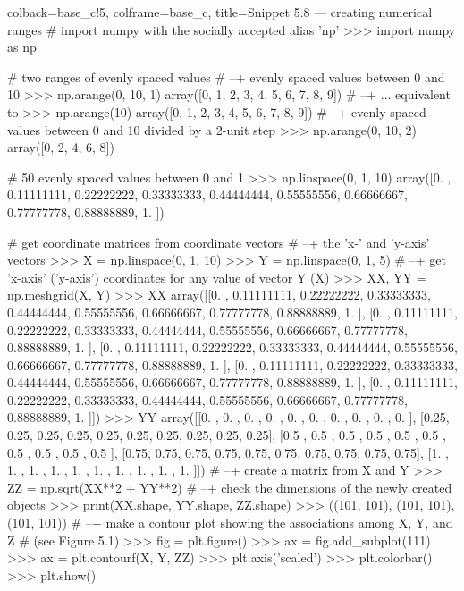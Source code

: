 \documentclass[a4paper,11pt]{book}
\begin{document}
\begin{pythoncode}[linenos=true,]{colback=base_c!5, colframe=base_c, title=\sffamily Snippet 5.8 --- creating numerical ranges}
# import numpy with the socially accepted alias 'np'
>>> import numpy as np

# two ranges of evenly spaced values
# --+ evenly spaced values between 0 and 10
>>> np.arange(0, 10, 1)
array([0, 1, 2, 3, 4, 5, 6, 7, 8, 9])
# --+ ... equivalent to
>>> np.arange(10)
array([0, 1, 2, 3, 4, 5, 6, 7, 8, 9])
# --+ evenly spaced values between 0 and 10 divided by a 2-unit step
>>> np.arange(0, 10, 2)
array([0, 2, 4, 6, 8])

# 50 evenly spaced values between 0 and 1
>>> np.linspace(0, 1, 10)
array([0.        , 0.11111111, 0.22222222, 0.33333333, 0.44444444,
       0.55555556, 0.66666667, 0.77777778, 0.88888889, 1.        ])

# get coordinate matrices from coordinate vectors 
# --+ the 'x-' and 'y-axis' vectors
>>> X = np.linspace(0, 1, 10)
>>> Y = np.linspace(0, 1, 5)
# --+ get 'x-axis' ('y-axis') coordinates for any value of vector Y (X)
>>> XX, YY = np.meshgrid(X, Y)
>>> XX 
array([[0.        , 0.11111111, 0.22222222, 0.33333333, 0.44444444,
        0.55555556, 0.66666667, 0.77777778, 0.88888889, 1.        ],
       [0.        , 0.11111111, 0.22222222, 0.33333333, 0.44444444,
        0.55555556, 0.66666667, 0.77777778, 0.88888889, 1.        ],
       [0.        , 0.11111111, 0.22222222, 0.33333333, 0.44444444,
        0.55555556, 0.66666667, 0.77777778, 0.88888889, 1.        ],
       [0.        , 0.11111111, 0.22222222, 0.33333333, 0.44444444,
        0.55555556, 0.66666667, 0.77777778, 0.88888889, 1.        ],
       [0.        , 0.11111111, 0.22222222, 0.33333333, 0.44444444,
        0.55555556, 0.66666667, 0.77777778, 0.88888889, 1.        ]])
>>> YY 
array([[0.  , 0.  , 0.  , 0.  , 0.  , 0.  , 0.  , 0.  , 0.  , 0.  ],
       [0.25, 0.25, 0.25, 0.25, 0.25, 0.25, 0.25, 0.25, 0.25, 0.25],
       [0.5 , 0.5 , 0.5 , 0.5 , 0.5 , 0.5 , 0.5 , 0.5 , 0.5 , 0.5 ],
       [0.75, 0.75, 0.75, 0.75, 0.75, 0.75, 0.75, 0.75, 0.75, 0.75],
       [1.  , 1.  , 1.  , 1.  , 1.  , 1.  , 1.  , 1.  , 1.  , 1.  ]])
# --+ create a matrix from X and Y 
>>> ZZ = np.sqrt(XX**2 + YY**2)
# --+ check the dimensions of the newly created objects 
>>> print(XX.shape, YY.shape, ZZ.shape)
>>> ((101, 101), (101, 101), (101, 101))
# --+ make a contour plot showing the associations among X, Y, and Z 
# (see Figure 5.1)
>>> fig = plt.figure()
>>> ax = fig.add_subplot(111)
>>> ax = plt.contourf(X, Y, ZZ)
>>> plt.axis('scaled')
>>> plt.colorbar()
>>> plt.show()
\end{pythoncode}
\end{document}
